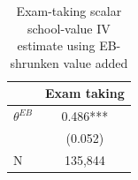 \begin{table}[!htbp]
\centering
\caption{Exam-taking scalar school-value IV estimate using EB-shrunken value added}
\label{tab:scalar_school_value_iv_exam_taking_expected_va_eb}
\begin{tabular}{lc}
\toprule
 & Exam taking \\
\midrule
$\theta^{EB}$ & 0.486*** \\
 & (0.052) \\
N & 135,844 \\
\bottomrule
\end{tabular}
\end{table}
